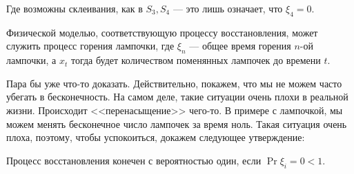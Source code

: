 Где возможны склеивания, как в $S_3, S_4$ --- это лишь означает, что $\xi_4 = 0$.

\begin{example}
  Физической моделью, соответствующую процессу восстановления, может служить
  процесс горения лампочки,
  где $\xi_n$ --- общее время горения $n$-ой лампочки, а $x_t$ тогда будет количеством
  поменянных лампочек до времени $t$.
\end{example}

Пара бы уже что-то доказать. Действительно, покажем, что мы не можем
часто убегать в бесконечность. На самом деле, такие ситуации очень плохи в реальной
жизни. Происходит <<перенасыщение>> чего-то. В примере с лампочкой, мы можем менять
бесконечное число лампочек за время ноль. Такая ситуация очень плоха, поэтому,
чтобы успокоиться, докажем следующее утверждение:

\begin{theorem}
  Процесс восстановления конечен с вероятностью один, если $\Pr{\xi_i = 0} < 1$.
\end{theorem}

